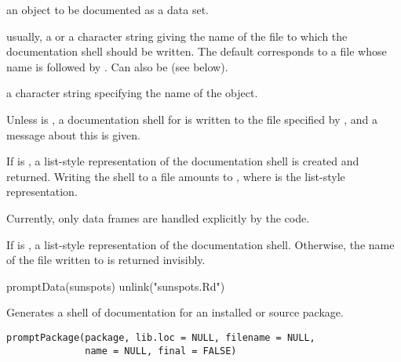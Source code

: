%
\begin{Arguments}
\begin{ldescription}
\item[\code{object}] an \R{} object to be documented as a data set.
\item[\code{filename}] usually, a  or a character string giving the
name of the file to which the documentation shell should be written.
The default corresponds to a file whose name is  followed
by .  Can also be  (see below).
\item[\code{name}] a character string specifying the name of the object.
\end{ldescription}
\end{Arguments}
%
\begin{Details}\relax
Unless  is , a documentation shell for
 is written to the file specified by , and
a message about this is given.

If  is , a list-style representation of the
documentation shell is created and returned.  Writing the shell to a
file amounts to ,
where  is the list-style representation.

Currently, only data frames are handled explicitly by the code.
\end{Details}
%
\begin{Value}
If  is , a list-style representation of the
documentation shell.  Otherwise, the name of the file written to is
returned invisibly.
\end{Value}
%
\begin{SeeAlso}\relax
{}
\end{SeeAlso}
%
\begin{Examples}
\begin{ExampleCode}
promptData(sunspots)
unlink("sunspots.Rd")
\end{ExampleCode}
\end{Examples}
%
\begin{Description}\relax
Generates a shell of documentation for an installed or source package.
\end{Description}
%
\begin{Usage}
\begin{verbatim}
promptPackage(package, lib.loc = NULL, filename = NULL,
              name = NULL, final = FALSE)
\end{verbatim}
\end{Usage}
